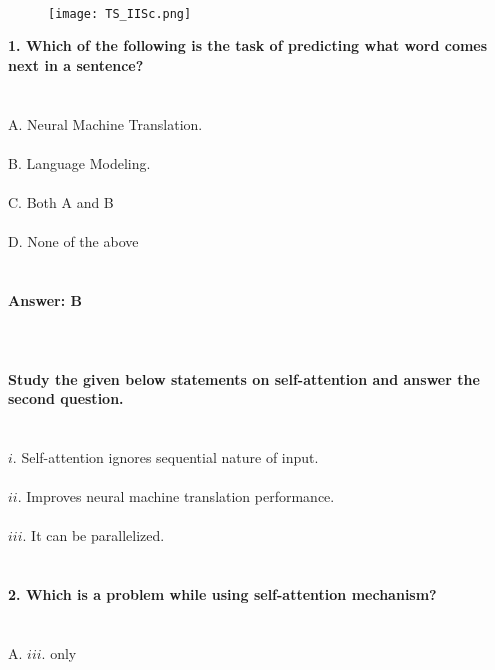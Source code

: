 \documentclass[prl,twocolumn,showpacs,preprintnumbers,superscriptaddress]{revtex4}
\theoremstyle{plain}
\theoremstyle{definition}
\begin{document}
\begin{widetext}
\\
\\
\\

\begin{wrapfigure}
\centering
\end{wrapfigure}
\begin{figure}[h!]
 \begin{right}
  \hfill\texttt{[image: TS\_IISc.png]}
 \end{right}
\end{figure}
\noindent\textbf{1. Which of the following is the task of predicting what word comes next in a sentence?}
\\
\\
\\
A. Neural Machine Translation.
\\
\\
B. Language Modeling.
\\
\\
C. Both A and B
\\
\\
D. None of the above
\\
\\
\\
\textbf{Answer: B}
\\
\\
\\
\\
\textbf{Study the given below statements on self-attention and answer the second question.}
\\
\\
\\
$i.$ Self-attention ignores sequential nature of input.
\\
\\
$ii.$ Improves neural machine translation performance.
\\
\\
$iii.$ It can be parallelized.
\\
\\
\\
\textbf{2. Which is a problem while using self-attention mechanism?}
\\
\\
\\
\noindent A. $iii.$ only
\\
\\

\end{widetext}
\end{document}
